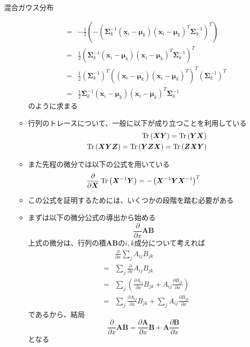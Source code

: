 \documentclass[dvipdfmx,notheorems,t]{beamer}
\begin{document}
\begin{frame}{混合ガウス分布}
\begin{itemize}
\begin{itemize}
\begin{eqnarray}
			&=& - \frac{1}{2} \left( - \left( \bm{\Sigma}_k^{-1} (\bm{x}_i - \bm{\mu}_k) (\bm{x}_i - \bm{\mu}_k)^T \bm{\Sigma}_k^{-1} \right)^T \right) \nonumber \\
			&=& \frac{1}{2} \left( \bm{\Sigma}_k^{-1} (\bm{x}_i - \bm{\mu}_k) (\bm{x}_i - \bm{\mu}_k)^T \bm{\Sigma}_k^{-1} \right)^T \nonumber \\
			&=& \frac{1}{2} \left( \bm{\Sigma}_k^{-1} \right)^T \left( (\bm{x}_i - \bm{\mu}_k) (\bm{x}_i - \bm{\mu}_k)^T \right)^T \left( \bm{\Sigma}_k^{-1} \right)^T \nonumber \\
			&=& \frac{1}{2} \bm{\Sigma}_k^{-1} (\bm{x}_i - \bm{\mu}_k) (\bm{x}_i - \bm{\mu}_k)^T \bm{\Sigma}_k^{-1}
		\end{eqnarray}
		のように求まる
		\newline
		
		\item 行列のトレースについて、一般に以下が成り立つことを利用している
		\begin{eqnarray}
			&& \operatorname{Tr} \left( \bm{X} \bm{Y} \right) = \operatorname{Tr} \left( \bm{Y} \bm{X} \right) \\
			&& \operatorname{Tr} \left( \bm{X} \bm{Y} \bm{Z} \right) = \operatorname{Tr} \left( \bm{Y} \bm{Z} \bm{X} \right) = \operatorname{Tr} \left( \bm{Z} \bm{X} \bm{Y} \right)
		\end{eqnarray}
		
		\item また先程の微分では以下の公式を用いている
		\begin{equation}
			\frac{\partial}{\partial \bm{X}} \operatorname{Tr} \left( \bm{X}^{-1} \bm{Y} \right) = - \left( \bm{X}^{-1} \bm{Y} \bm{X}^{-1} \right)^T
		\end{equation}
		
		\item この公式を証明するためには、いくつかの段階を踏む必要がある
		\newline
		
		\item まずは以下の微分公式の導出から始める
		\begin{equation}
			\frac{\partial}{\partial x} \bm{A} \bm{B} \nonumber
		\end{equation}
		上式の微分は、行列の積$\bm{A} \bm{B}$の$i, k$成分について考えれば
		\begin{eqnarray}
			&& \frac{\partial}{\partial x} \sum_j A_{ij} B_{jk} \nonumber \\
			&=& \sum_j \frac{\partial}{\partial x} A_{ij} B_{jk} \nonumber \\
			&=& \sum_j \left( \frac{\partial A_{ij}}{\partial x} B_{jk} + A_{ij} \frac{\partial B_{jk}}{\partial x} \right) \nonumber \\
			&=& \sum_j \frac{\partial A_{ij}}{\partial x} B_{jk} + \sum_j A_{ij} \frac{\partial B_{jk}}{\partial x}
		\end{eqnarray}
		であるから、結局
		\begin{equation}
			\frac{\partial}{\partial x} \bm{A} \bm{B} = \frac{\partial \bm{A}}{\partial x} \bm{B} + \bm{A} \frac{\partial \bm{B}}{\partial x}
		\end{equation}
		となる
		

\end{itemize}
\end{itemize}
\end{frame}
\end{document}
